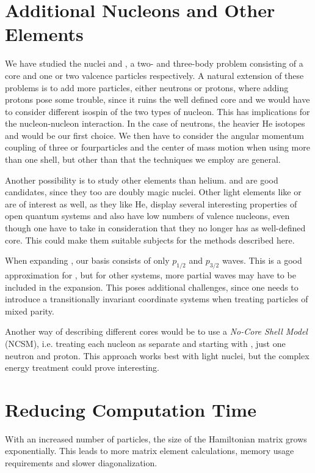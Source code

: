 \documentclass[../main/report.tex]{subfiles}
\begin{document}
\section{Additional Nucleons and Other Elements}

We have studied the nuclei  and , a two- and three-body problem consisting of a core and one or two valcence particles respectively.
A natural extension of these problems is to add more particles, either neutrons or protons, where adding protons pose some trouble, since it ruins the well defined core and we would have to consider different isospin of the two types of nucleon.
This has implications for the nucleon-nucleon interaction.
In the case of neutrons, the heavier He isotopes  and  would be our first choice.
We then have to consider the angular momentum coupling of three or fourparticles and the center of mass motion when using more than one shell, but other than that the techniques we employ are general.

Another possibility is to study other elements than helium.  and  are good candidates, since they too are doubly magic nuclei.
Other light elements like  or  are of interest as well, as they like He, display several interesting properties of open quantum systems and also have low numbers of valence nucleons, even though one have to take in consideration that they no longer has as well-defined core.
This could make them suitable subjects for the methods described here.

When expanding , our basis consists of only $p_{1/2}$ and $p_{3/2}$ waves. 
This is a good approximation for  \cite{gamow_shell_model_2008},  but for other systems, more partial waves may have to be included in the expansion.
This poses additional challenges, since one needs to introduce a transitionally invariant coordinate systems when treating particles of mixed parity. 

Another way of describing different cores would be to use a \emph{No-Core Shell Model} (NCSM), i.e. treating each nucleon as separate and starting with , just one neutron and proton. 
This approach works best with light nuclei, but the complex energy treatment could prove interesting.

\section{Reducing Computation Time}
With an increased number of particles, the size of the Hamiltonian matrix grows exponentially. This leads to more matrix element calculations, memory usage requirements and slower diagonalization.
\end{document}
